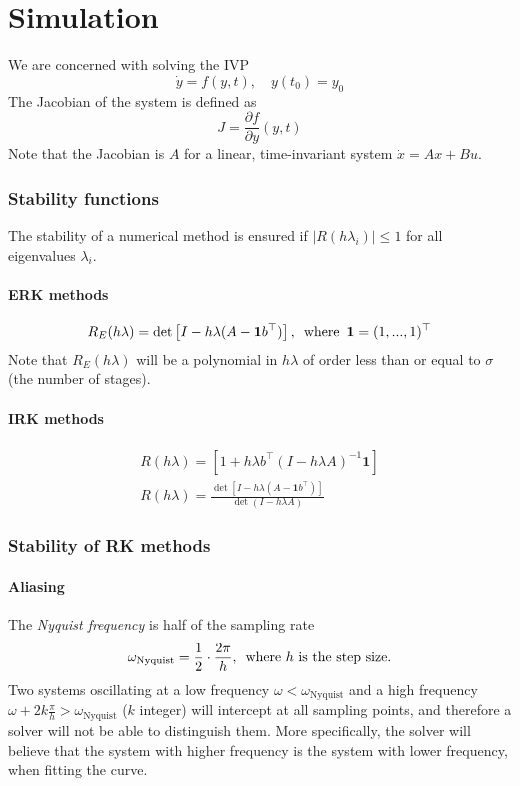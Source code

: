 \part{Simulation}
We are concerned with solving the IVP
\begin{equation}
    \Dot{y} = f(y,t), \quad y(t_0) = y_0
\end{equation}
The Jacobian of the system is defined as
\begin{equation}
    J = \frac{\partial f}{\partial y}(y,t)
\end{equation}
Note that the Jacobian is $A$ for a linear, time-invariant system $\dot{x} = Ax + Bu$.

\section{Stability functions}
The stability of a numerical method is ensured if $|R(h\lambda_i)| \leq 1$ for all eigenvalues $\lambda_i$.
\subsection{ERK methods}
\begin{equation}
    R_E(h\lambda) = \det \left[ I - h\lambda (A - \mathbf{1} b^\top) \right], \enskip \text{where} \enskip  \mathbf{1} = (1, ... , 1)^\top
\end{equation}
Note that $R_E(h\lambda)$ will be a polynomial in $h\lambda$ of order less than or equal to $\sigma$ (the number of stages).

\subsection{IRK methods}
\begin{align}
    R(h\lambda) = \left[ 1 + h\lambda b^\top (I-h\lambda A)^{-1} \mathbf{1} \right]\\
    R(h\lambda) = \frac{\det \left[ I - h\lambda(A - \mathbf{1}b^\top) \right]}{\det(I - h\lambda A)}
\end{align}

\section{Stability of RK methods}
\subsection{Aliasing}
The \textit{Nyquist frequency} is half of the sampling rate
\begin{equation}
    \omega_{\text{Nyquist}} = \frac{1}{2} \cdot \frac{2\pi}{h}, \enskip \text{where $h$ is the step size.}
\end{equation}
Two systems oscillating at a low frequency $\omega < \omega_{\text{Nyquist}}$ and a high frequency $\omega + 2k\frac{\pi}{h} > \omega_{\text{Nyquist}}$ ($k$ integer) will intercept at all sampling points, and therefore a solver will not be able to distinguish them. More specifically, the solver will believe that the system with higher frequency is the system with lower frequency, when fitting the curve.

